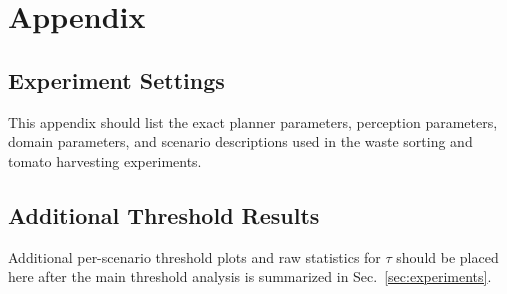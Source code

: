 \section{Appendix}
\label{app:appendix}

\subsection{Experiment Settings}
\label{app:settings}

This appendix should list the exact planner parameters, perception parameters, domain parameters, and scenario descriptions used in the waste sorting and tomato harvesting experiments.

\subsection{Additional Threshold Results}
\label{app:tau}

Additional per-scenario threshold plots and raw statistics for $\tau$ should be placed here after the main threshold analysis is summarized in Sec.~\ref{sec:experiments}.
